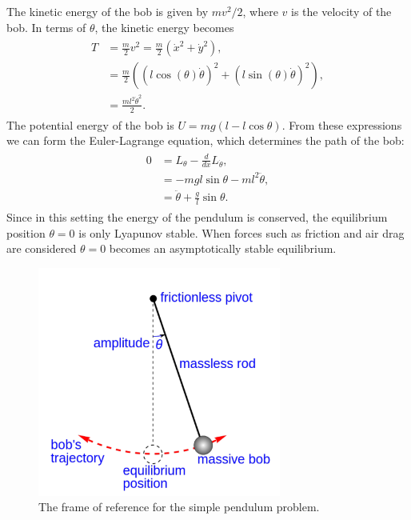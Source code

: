 The kinetic energy of the bob is given by $mv^2/2$, where $v$ is the velocity of the bob. 
In terms of $\theta$, the kinetic energy becomes 
\begin{align}
	\begin{split}
	T &= \frac{m}{2}v^2  = \frac{m}{2}(\dot{x}^2 + \dot{y}^2),\\
	&= \frac{m}{2}((l\cos(\theta)\dot{\theta})^2 + (l\sin(\theta)\dot{\theta})^2),\\
	&= \frac{ml^2\dot{\theta}^2}{2}.
	\end{split}
\end{align}
The potential energy of the bob is $U = mg(l-l\cos \theta)$. 
From these expressions we can form the Euler-Lagrange equation, which determines the path of the bob: 
\begin{align}
	\begin{split}
	0 &= L_{\theta} - \frac{d}{dx}L_{\dot{\theta}},\\
	&= -mgl\sin \theta - m l^2 \ddot{\theta},\\
	&= \ddot{\theta} + \frac{g}{l}\sin \theta.
	\end{split}
\end{align}
Since in this setting the energy of the pendulum is conserved, the equilibrium position $\theta = 0$ is only Lyapunov stable. When forces such as friction and air drag are considered $\theta = 0$ becomes an asymptotically stable equilibrium. 

\begin{figure}
\centering
\includegraphics[width=8cm]{Simple_gravity_pendulum.pdf}
\caption{The frame of reference for the simple pendulum problem.
}
\label{fig:inverted_pendulum:simple_gravity_pendulum}
\end{figure}


